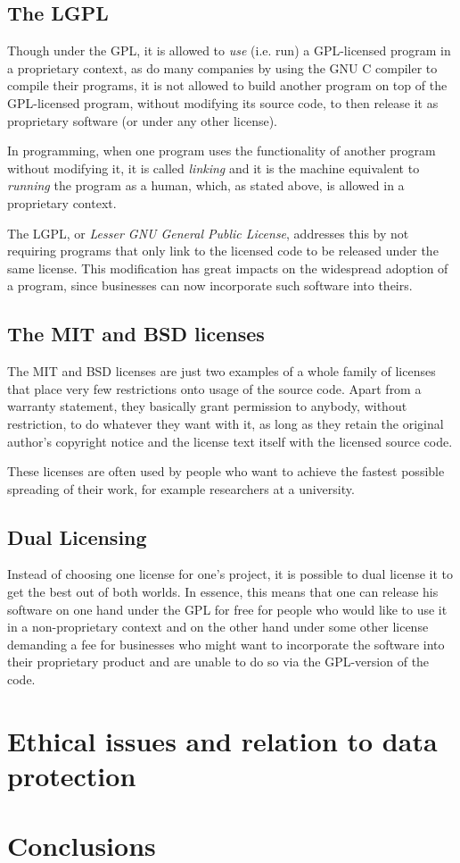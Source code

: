 \documentclass{article}
\begin{document}
\subsection{The LGPL}
Though under the GPL, it is allowed to \emph{use} (i.e. run) a
GPL-licensed program
in a proprietary context, as do many companies by using the GNU C
compiler to compile their programs, it is not allowed to build
another program on top of the GPL-licensed program, without
modifying its source code, to then release it as proprietary
software (or under any other license).

In programming, when one program uses the functionality of another
program without modifying it, it is called \emph{linking} and it
is the machine equivalent to \emph{running} the program as a human,
which, as stated above, is allowed in a proprietary context.

The LGPL, or \emph{Lesser GNU General Public License}, addresses
this by not requiring programs that only link to the licensed code
to be released under the same license. This modification has great
impacts on the widespread adoption of a program, since businesses
can now incorporate such software into theirs.
\subsection{The MIT and BSD licenses}
The MIT and BSD licenses are just two examples of a whole family of
licenses that place very few restrictions onto usage of the source
code. Apart from a warranty statement, they basically grant
permission to anybody, without restriction, to do whatever they
want with it, as long as they retain the original author's
copyright notice and the license text itself with the licensed
source code.

These licenses are often used by people who want to achieve the
fastest possible spreading of their work, for example researchers
at a university.
\subsection{Dual Licensing}
Instead of choosing one license for one's project, it is possible
to dual license it to get the best out of both worlds. In essence,
this means that one can release his software on one hand under the
GPL for free for people who would like to use it in a
non-proprietary context and on the other hand under some other
license demanding a fee for businesses who might want to
incorporate the software into their proprietary product and are
unable to do so via the GPL-version of the code.

\section{Ethical issues and relation to data protection}

\section{Conclusions}
\end{document}
